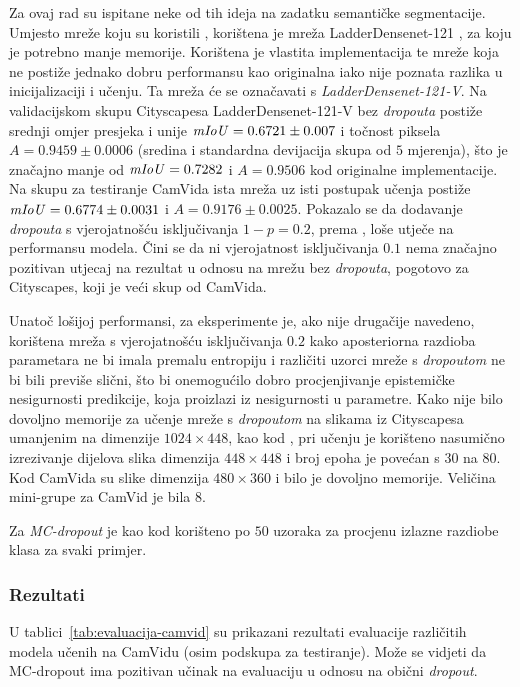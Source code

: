 \documentclass[utf8, diplomski, lmodern]{fer}
\begin{document}
Za ovaj rad su ispitane neke od tih ideja na zadatku semantičke segmentacije. Umjesto mreže koju su koristili \citet{Kendall:2017:WUNBDLCV}, korištena je mreža LadderDensenet-121 \citep{Kreso:2017:LSDFSSLNI}, za koju je potrebno manje memorije. Korištena je vlastita implementacija te mreže koja ne postiže jednako dobru performansu kao originalna iako nije poznata razlika u inicijalizaciji i učenju. Ta mreža će se označavati s \textit{LadderDensenet-121-V}. Na validacijskom skupu Cityscapesa \citep{Cordts:2016:Cityscapes} LadderDensenet-121-V bez \textit{dropouta} postiže srednji omjer presjeka i unije $\mathit{mIoU}=0.6721\pm0.007$ i točnost piksela $A=0.9459\pm0.0006$ (sredina i standardna devijacija skupa od $5$ mjerenja), što je značajno manje od $\mathit{mIoU}=0.7282$ i $A=0.9506$ kod originalne implementacije. Na skupu za testiranje CamVida \citep{Brostow:2008:CamVid} ista mreža uz isti postupak učenja postiže $\mathit{mIoU}=0.6774\pm0.0031$ i $A=0.9176\pm0.0025$. Pokazalo se da dodavanje \textit{dropouta} s vjerojatnošću isključivanja $1-p=0.2$, prema \citep{Huang:2016:DCCN}, loše utječe na performansu modela. Čini se da ni vjerojatnost isključivanja $0.1$ nema značajno pozitivan utjecaj na rezultat u odnosu na mrežu bez \textit{dropouta}, pogotovo za Cityscapes, koji je veći skup od CamVida. 

Unatoč lošijoj performansi, za eksperimente je, ako nije drugačije navedeno, korištena mreža s vjerojatnošću isključivanja $0.2$ kako aposteriorna razdioba parametara ne bi imala premalu entropiju i različiti uzorci mreže s \textit{dropoutom} ne bi bili previše slični, što bi onemogućilo dobro procjenjivanje epistemičke nesigurnosti predikcije, koja proizlazi iz nesigurnosti u parametre. Kako nije bilo dovoljno memorije za učenje mreže s \textit{dropoutom} na slikama iz Cityscapesa umanjenim na dimenzije $1024\times448$, kao kod \citet{Kreso:2017:LSDFSSLNI}, pri učenju je korišteno nasumično izrezivanje dijelova slika dimenzija $448\times448$ i broj epoha je povećan s $30$ na $80$. Kod CamVida su slike dimenzija $480\times360$ i bilo je dovoljno memorije. Veličina mini-grupe za CamVid je bila $8$. 

Za \textit{MC-dropout} je kao kod \cite{Kendall:2017:WUNBDLCV} korišteno po $50$ uzoraka za procjenu izlazne razdiobe klasa za svaki primjer.

\subsubsection{Rezultati}

U tablici~\ref{tab:evaluacija-camvid} su prikazani rezultati evaluacije različitih modela učenih na CamVidu (osim podskupa za testiranje). Može se vidjeti da MC-dropout ima pozitivan učinak na evaluaciju u odnosu na obični \textit{dropout}.
\end{document}
